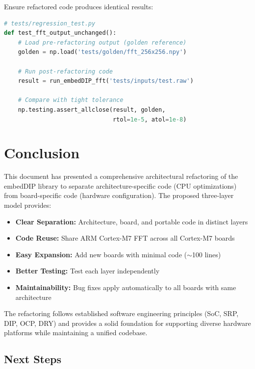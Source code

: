 \documentclass[11pt,a4paper]{article}
\begin{document}
Ensure refactored code produces identical results:

\begin{lstlisting}[language=Python,caption={Python regression test}]
# tests/regression_test.py
def test_fft_output_unchanged():
    # Load pre-refactoring output (golden reference)
    golden = np.load('tests/golden/fft_256x256.npy')

    # Run post-refactoring code
    result = run_embedDIP_fft('tests/inputs/test.raw')

    # Compare with tight tolerance
    np.testing.assert_allclose(result, golden,
                               rtol=1e-5, atol=1e-8)
\end{lstlisting}

\section{Conclusion}

This document has presented a comprehensive architectural refactoring of the embedDIP library to separate architecture-specific code (CPU optimizations) from board-specific code (hardware configuration). The proposed three-layer model provides:

\begin{itemize}
    \item \textbf{Clear Separation:} Architecture, board, and portable code in distinct layers
    \item \textbf{Code Reuse:} Share ARM Cortex-M7 FFT across all Cortex-M7 boards
    \item \textbf{Easy Expansion:} Add new boards with minimal code ($\sim$100 lines)
    \item \textbf{Better Testing:} Test each layer independently
    \item \textbf{Maintainability:} Bug fixes apply automatically to all boards with same architecture
\end{itemize}

The refactoring follows established software engineering principles (SoC, SRP, DIP, OCP, DRY) and provides a solid foundation for supporting diverse hardware platforms while maintaining a unified codebase.

\subsection{Next Steps}
\end{document}
